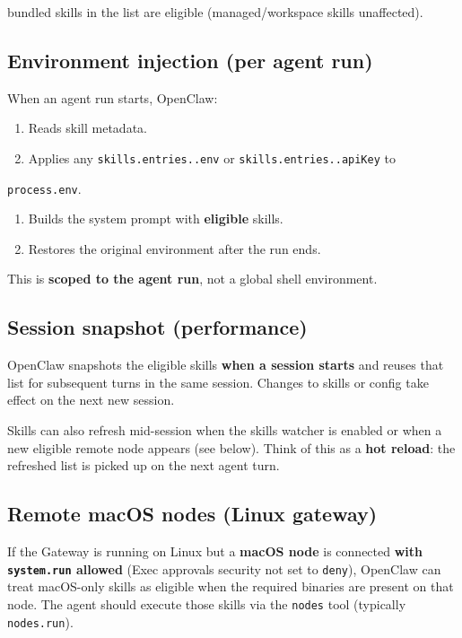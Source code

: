 bundled skills in the list are eligible (managed/workspace skills unaffected).

\subsection{Environment injection (per agent run)}


When an agent run starts, OpenClaw:

\begin{enumerate}
  \item Reads skill metadata.
  \item Applies any \texttt{skills.entries..env} or \texttt{skills.entries..apiKey} to
\end{enumerate}

\texttt{process.env}.
\begin{enumerate}
  \item Builds the system prompt with \textbf{eligible} skills.
  \item Restores the original environment after the run ends.
\end{enumerate}


This is \textbf{scoped to the agent run}, not a global shell environment.

\subsection{Session snapshot (performance)}


OpenClaw snapshots the eligible skills \textbf{when a session starts} and reuses that list for subsequent turns in the same session. Changes to skills or config take effect on the next new session.

Skills can also refresh mid-session when the skills watcher is enabled or when a new eligible remote node appears (see below). Think of this as a \textbf{hot reload}: the refreshed list is picked up on the next agent turn.

\subsection{Remote macOS nodes (Linux gateway)}


If the Gateway is running on Linux but a \textbf{macOS node} is connected \textbf{with \texttt{system.run} allowed} (Exec approvals security not set to \texttt{deny}), OpenClaw can treat macOS-only skills as eligible when the required binaries are present on that node. The agent should execute those skills via the \texttt{nodes} tool (typically \texttt{nodes.run}).

